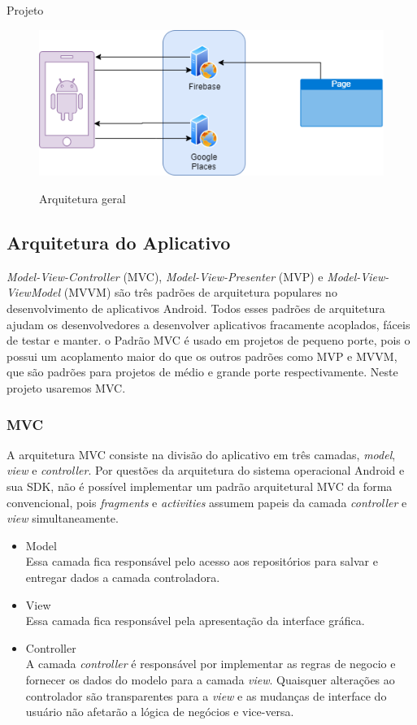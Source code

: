 \documentclass[
	12pt,				%
	openright,			%
	twoside,			%
	a4paper,			%
	english,			%
	french,				%
	spanish,			%
	brazil				%
	]{abntex2}
\begin{document}
\begin{chapter}{Projeto}
\begin{figure}[h]
\centering
   \caption{Arquitetura geral}
   \includegraphics[scale=0.85]{media/arquitetura_app.png}
     \label{fig:arquitetura_geral}
\end{figure}

\subsection{Arquitetura do Aplicativo}
\textit{Model-View-Controller} (MVC),  \textit{Model-View-Presenter} (MVP) e \textit{Model-View-ViewModel} (MVVM) são três padrões de arquitetura populares no desenvolvimento de aplicativos Android. Todos esses padrões de arquitetura ajudam os desenvolvedores a desenvolver aplicativos fracamente acoplados, fáceis de testar e manter. o Padrão MVC é usado em projetos de pequeno porte, pois o possui um acoplamento maior do que os outros padrões como MVP e MVVM, que são padrões para projetos de médio e grande porte respectivamente. Neste projeto usaremos MVC.\\

\subsubsection{MVC}
A arquitetura MVC consiste na divisão do aplicativo em três camadas,  \textit{model}, \textit{view} e \textit{controller}. Por questões da arquitetura do sistema operacional Android e sua SDK, não é possível implementar um padrão arquitetural MVC da forma convencional, pois \textit{fragments} e \textit{activities} assumem papeis da camada \textit{controller} e \textit{view} simultaneamente.

\begin{itemize}
  \item{Model}\\ Essa camada fica responsável pelo acesso aos repositórios para salvar e entregar dados a camada controladora.
     \item{View}\\ Essa camada fica responsável pela apresentação da interface gráfica.
       \item{Controller}\\ A camada \textit{controller} é responsável por implementar as regras de negocio e fornecer os dados do modelo para a camada \textit{view}. Quaisquer alterações ao controlador são transparentes para a \textit{view} e as mudanças de interface do usuário não afetarão a lógica de negócios e vice-versa.
\end{itemize}


\end{chapter}
\end{document}
